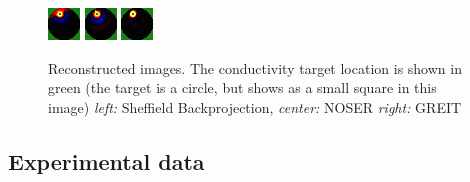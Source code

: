 \documentclass[12pt]{iopart}
\begin{document}
\begin{figure}[bhtp]
\begin{center}
  \includegraphics[width= 0.2 \textwidth, bb=0 0 32 32]
         {../../tutorial/GREIT-evaluation/simulation_test_imgs/simulation_test03_1.png}
  \includegraphics[width= 0.2 \textwidth, bb=0 0 32 32]
         {../../tutorial/GREIT-evaluation/simulation_test_imgs/simulation_test03_2.png}
  \includegraphics[width= 0.2 \textwidth, bb=0 0 32 32]
         {../../tutorial/GREIT-evaluation/simulation_test_imgs/simulation_test03_4.png}
\caption{ \label{fig:rimage}
Reconstructed images. The conductivity target location is shown in green (the target is a circle, but shows as a small square in this image)
{\em left:} Sheffield Backprojection,
{\em center:} NOSER
{\em right:} GREIT
}
\end{center}
\end{figure}

\subsection{Experimental data}
\end{document}
